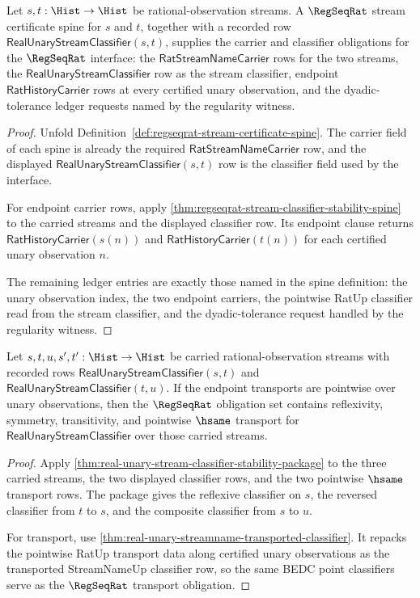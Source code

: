 \begin{theorem}
\label{thm:regseqrat-obligation-carrier-classifier}
Let $s,t:\Hist\to\Hist$ be rational-observation streams. A
$\RegSeqRat$ stream certificate spine for $s$ and $t$, together with a recorded
row $\mathsf{RealUnaryStreamClassifier}(s,t)$, supplies the carrier and
classifier obligations for the $\RegSeqRat$ interface: the
$\mathsf{RatStreamNameCarrier}$ rows for the two streams, the
$\mathsf{RealUnaryStreamClassifier}$ row as the stream classifier, endpoint
$\mathsf{RatHistoryCarrier}$ rows at every certified unary observation, and
the dyadic-tolerance ledger requests named by the regularity witness.
\end{theorem}
\begin{proof}
Unfold Definition~\ref{def:regseqrat-stream-certificate-spine}. The carrier
field of each spine is already the required
$\mathsf{RatStreamNameCarrier}$ row, and the displayed
$\mathsf{RealUnaryStreamClassifier}(s,t)$ row is the classifier field used by
the interface.

For endpoint carrier rows, apply
\autoref{thm:regseqrat-stream-classifier-stability-spine} to the carried
streams and the displayed classifier row. Its endpoint clause returns
$\mathsf{RatHistoryCarrier}(s(n))$ and $\mathsf{RatHistoryCarrier}(t(n))$ for
each certified unary observation $n$.

The remaining ledger entries are exactly those named in the spine definition:
the unary observation index, the two endpoint carriers, the pointwise RatUp
classifier read from the stream classifier, and the dyadic-tolerance request
handled by the regularity witness.
\end{proof}

\begin{theorem}
\label{thm:regseqrat-obligation-stability-transport}
Let $s,t,u,s',t':\Hist\to\Hist$ be carried rational-observation streams with
recorded rows $\mathsf{RealUnaryStreamClassifier}(s,t)$ and
$\mathsf{RealUnaryStreamClassifier}(t,u)$. If the endpoint transports are
pointwise over unary observations, then the $\RegSeqRat$ obligation set
contains reflexivity, symmetry, transitivity, and pointwise $\hsame$ transport
for $\mathsf{RealUnaryStreamClassifier}$ over those carried streams.
\end{theorem}
\begin{proof}
Apply \autoref{thm:real-unary-stream-classifier-stability-package} to the
three carried streams, the two displayed classifier rows, and the two
pointwise $\hsame$ transport rows. The package gives the reflexive classifier
on $s$, the reversed classifier from $t$ to $s$, and the composite classifier
from $s$ to $u$.

For transport, use
\autoref{thm:real-unary-streamname-transported-classifier}. It repacks the
pointwise RatUp transport data along certified unary observations as the
transported StreamNameUp classifier row, so the same BEDC point classifiers
serve as the $\RegSeqRat$ transport obligation.
\end{proof}

